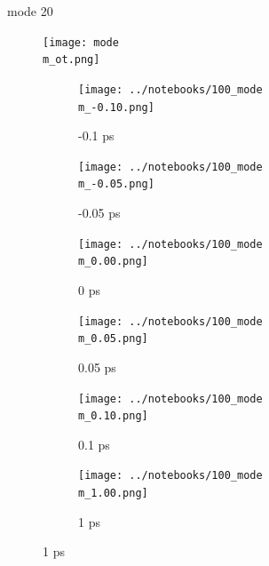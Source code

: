 \documentclass{beamer}
\newcommand\w{0.32}
\begin{document}
\renewcommand\m{20}
\begin{frame}{mode \m}
					\vspace{\vh mm}
	\begin{figure}
		\centering
		\texttt{[image: mode\\m\_ot.png]}
	\end{figure}
	\begin{figure}
		\centering
		\begin{subfigure}[b]{\w\textwidth}
			\centering
			\texttt{[image: ../notebooks/100\_mode\\m\_-0.10.png]}
			\caption{-0.1 ps}
		\end{subfigure}
		\begin{subfigure}[b]{\w\textwidth}
			\centering
			\texttt{[image: ../notebooks/100\_mode\\m\_-0.05.png]}
			\caption{-0.05 ps}
		\end{subfigure}
		\begin{subfigure}[b]{\w\textwidth}
			\centering
			\texttt{[image: ../notebooks/100\_mode\\m\_0.00.png]}
			\caption{0 ps}
		\end{subfigure}
		\begin{subfigure}[b]{\w\textwidth}
			\centering
			\texttt{[image: ../notebooks/100\_mode\\m\_0.05.png]}
			\caption{0.05 ps}
		\end{subfigure}
		\begin{subfigure}[b]{\w\textwidth}
			\centering
			\texttt{[image: ../notebooks/100\_mode\\m\_0.10.png]}
			\caption{0.1 ps}
		\end{subfigure}
		\begin{subfigure}[b]{\w\textwidth}
			\centering
			\texttt{[image: ../notebooks/100\_mode\\m\_1.00.png]}
			\caption{1 ps}
		\end{subfigure}
	\end{figure}
\end{frame}
\end{document}
